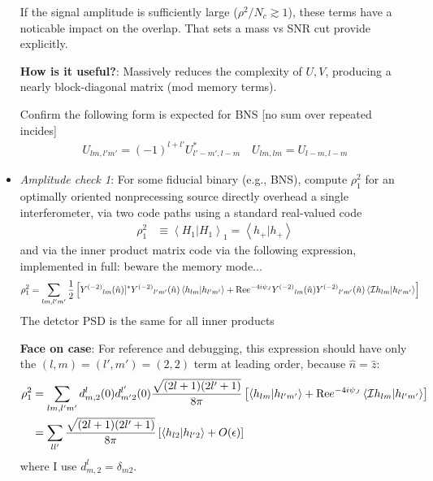 \documentclass[twocolumn,prd,nofootinbib]{revtex4}
\newcommand\editremark[1]{{\color{red} #1}}
\newcommand\Y[1]{Y^{(#1)}{}}
\newcommand\qmstateproduct[2]{\left\langle#1|#2\right\rangle}
\begin{document}
\begin{widetext}
\begin{widetext}
\begin{itemize}
\begin{shaded}
If the signal amplitude is sufficiently large ($ \rho^2/N_c \gtrsim 1$), these terms have a noticable impact on the
overlap.  That sets a mass vs SNR cut \editremark{provide explicitly}. 

%

\noindent \textbf{How is it useful?}: Massively reduces the complexity of $U,V$, producing a nearly block-diagonal
matrix (mod memory terms).
\end{shaded}

Confirm the following form is expected for BNS [no sum over repeated incides]
\begin{eqnarray}
U_{lm,l'm'} =(-1)^{l+l'}U_{l'-m',l-m}^* \quad  U_{lm,lm} = U_{l-m,l-m}
\end{eqnarray}

\item \emph{Amplitude check 1}: For some fiducial binary (e.g., BNS), compute $\rho_1^2$ for an optimally oriented nonprecessing source directly overhead a
  single interferometer, via two code paths using a standard real-valued code
\begin{align}
\rho^2_1 &\equiv\qmstateproduct{H_1}{H_1}_1 = \qmstateproduct{h_+}{h_+} 
\end{align}
and via the inner product matrix code  via the following expression, implemented in full: \editremark{beware the memory mode...}
\begin{align}
\rho^2_1& = \sum_{lm,l'm'} \frac{1}{2} \left[ \Y{-2}_{lm}(\hat{n})]^*\Y{-2}_{l'm'}(\hat{n})\qmstateproduct{h_{lm}}{h_{l'm'}}
  +\text{Re}e^{-4i\psi_J}\Y{-2}_{lm}(\hat{n})\Y{-2}_{l'm'}(\hat{n})\qmstateproduct{{\cal I}h_{lm}}{h_{l'm'}} \right]
\end{align}
The detctor PSD is the same for all inner products
\begin{shaded}
\noindent \textbf{Face on case}: For reference and debugging, this expression  should have only the $(l,m)=(l',m')=(2,2)$ term at leading order, because $\hat{n}=\hat{z}$:
\begin{align}
 \rho_1^2&= \sum_{lm,l'm'}d^l_{m,2}(0)d^{l'}_{m'2}(0) \frac{\sqrt{(2l+1)(2l'+1)}}{8\pi} \left[\qmstateproduct{h_{lm}}{h_{l'm'}} 
 +  \text{Re}e^{-4i\psi_J}  \qmstateproduct{{\cal I}h_{lm}}{h_{l'm'}}
\right] \\
 &= \sum_{ll'}\frac{\sqrt{(2l+1)(2l'+1)}}{8\pi} \left[\qmstateproduct{h_{l2}}{h_{l'2}}  + O(\epsilon)
\right]
\end{align}
where I use $d^l_{m,2}=\delta_{m2}$.



\end{shaded}
\end{itemize}
\end{widetext}
\end{widetext}
\end{document}
